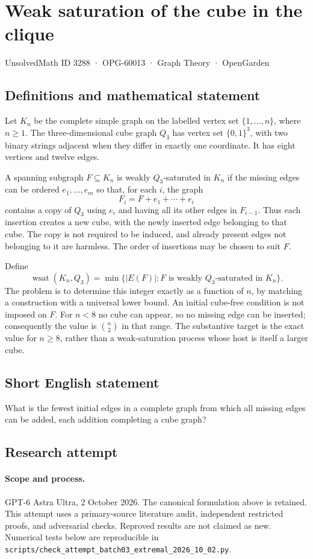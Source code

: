 \documentclass[11pt,a4paper]{article}
\begin{document}
\section*{Weak saturation of the cube in the clique}\label{3288}
{\small UnsolvedMath ID 3288 · OPG-60013 · Graph Theory · OpenGarden}
\subsection{Definitions and mathematical statement}
Let $K_n$ be the complete simple graph on the labelled vertex set
$\{1,\ldots,n\}$, where $n\ge1$. The three-dimensional cube graph $Q_3$
has vertex set $\{0,1\}^3$, with two binary strings adjacent when they
differ in exactly one coordinate. It has eight vertices and twelve
edges.

A spanning subgraph $F\subseteq K_n$ is weakly $Q_3$-saturated in $K_n$
if the missing edges can be ordered $e_1,\ldots,e_m$ so that, for each
$i$, the graph
\[
                   F_i=F+e_1+\cdots+e_i
\]
contains a copy of $Q_3$ using $e_i$ and having all its other edges in
$F_{i-1}$. Thus each insertion creates a new cube, with the newly
inserted edge belonging to that cube. The copy is not required to be
induced, and already present edges not belonging to it are harmless.
The order of insertions may be chosen to suit $F$.

Define
\[
 \operatorname{wsat}(K_n,Q_3)=
       \min\{|E(F)|:F\text{ is weakly }Q_3\text{-saturated in }K_n\}.
\]
The problem is to determine this integer exactly as a function of $n$,
by matching a construction with a universal lower bound. An initial
cube-free condition is not imposed on $F$. For $n<8$ no cube can appear,
so no missing edge can be inserted; consequently the value is
$\binom n2$ in that range. The substantive target is the exact value
for $n\ge8$, rather than a weak-saturation process whose host is itself
a larger cube.
\subsection{Short English statement}
What is the fewest initial edges in a complete graph from which all missing edges can be added, each addition completing a cube graph?
\subsection{Research attempt}
\paragraph{Scope and process.}
GPT-6 Astra Ultra, 2 October 2026. The canonical formulation above is retained. This attempt uses a primary-source literature audit, independent restricted proofs, and adversarial checks. Reproved results are not claimed as new. Numerical tests below are reproducible in \texttt{scripts/check\_attempt\_batch03\_extremal\_2026\_10\_02.py}.
\end{document}
